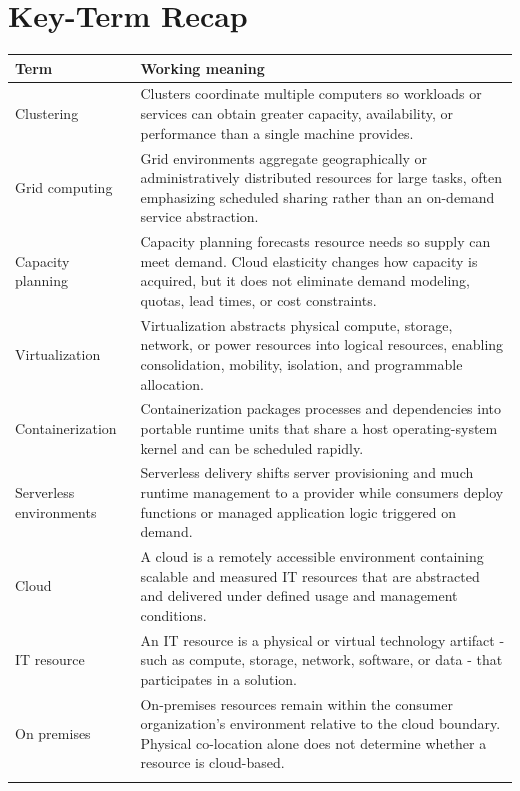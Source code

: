 \documentclass[11pt]{article}
\begin{document}
\section{Key-Term Recap}
\begin{longtable}{@{}>{\RaggedRight\arraybackslash}p{}>{\RaggedRight\arraybackslash}p{}@{}}
\toprule\rowcolor{Navy}\color{white}\textbf{Term} & \color{white}\textbf{Working meaning}\\\midrule\endhead
Clustering & Clusters coordinate multiple computers so workloads or services can obtain greater capacity, availability, or performance than a single machine provides. \\\addlinespace[2pt]
Grid computing & Grid environments aggregate geographically or administratively distributed resources for large tasks, often emphasizing scheduled sharing rather than an on-demand service abstraction. \\\addlinespace[2pt]
Capacity planning & Capacity planning forecasts resource needs so supply can meet demand. Cloud elasticity changes how capacity is acquired, but it does not eliminate demand modeling, quotas, lead times, or cost constraints. \\\addlinespace[2pt]
Virtualization & Virtualization abstracts physical compute, storage, network, or power resources into logical resources, enabling consolidation, mobility, isolation, and programmable allocation. \\\addlinespace[2pt]
Containerization & Containerization packages processes and dependencies into portable runtime units that share a host operating-system kernel and can be scheduled rapidly. \\\addlinespace[2pt]
Serverless environments & Serverless delivery shifts server provisioning and much runtime management to a provider while consumers deploy functions or managed application logic triggered on demand. \\\addlinespace[2pt]
Cloud & A cloud is a remotely accessible environment containing scalable and measured IT resources that are abstracted and delivered under defined usage and management conditions. \\\addlinespace[2pt]
IT resource & An IT resource is a physical or virtual technology artifact - such as compute, storage, network, software, or data - that participates in a solution. \\\addlinespace[2pt]
On premises & On-premises resources remain within the consumer organization's environment relative to the cloud boundary. Physical co-location alone does not determine whether a resource is cloud-based. \\\addlinespace[2pt]

\end{longtable}
\end{document}
